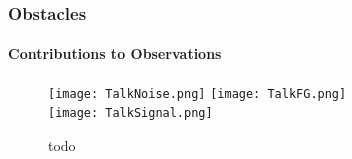 \documentclass{beamer}
\begin{document}
\begin{frame}
\frametitle{Obstacles}
\framesubtitle{Contributions to Observations}
\begin{figure}[h]
  \centering
  \texttt{[image: TalkNoise.png]}
  \texttt{[image: TalkFG.png]}\\
  \texttt{[image: TalkSignal.png]}
  \caption{todo}
  \label{fig:todo}
\end{figure}
\end{frame}




\end{document}
